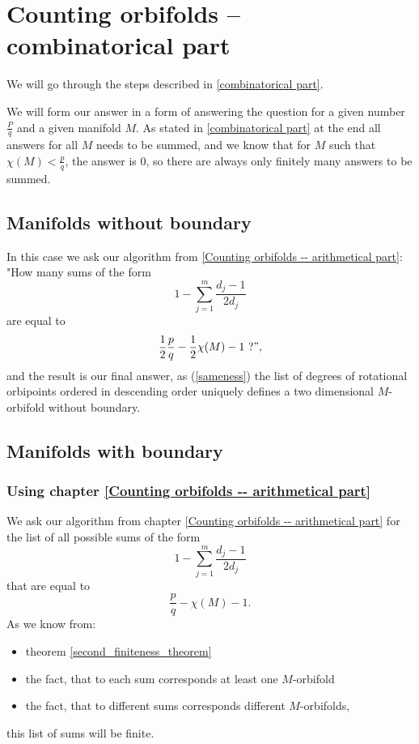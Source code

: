 \chapter{Counting orbifolds -- combinatorical part}\label{Counting orbifolds -- combinatorical part}
We will go through the steps described in \ref{combinatorical part}.

We will form our answer in a form of answering the 
question for a given number $\frac{P}{q}$ and a given manifold $M$. 
As stated in \ref{combinatorical part} at the end all answers for all $M$ needs to be summed, 
and we know that for $M$ such that $\chi(M) < \frac{p}{q}$, the answer is $0$, so there 
are always only finitely many answers to be summed. 

\section{Manifolds without boundary}
In this case we ask our algorithm from \ref{Counting orbifolds -- arithmetical part}: 
"How many sums of the form
\begin{equation}
1-\sum_{j=1}^m \frac{d_j-1}{2d_j} 
\end{equation}
are equal to 
\begin{equation}
\frac{1}{2}\frac{p}{q} - \frac{1}{2}\chi(M) -1\ ?",
\end{equation}
and the result is our final answer, as (\ref{sameness}) the list of degrees of rotational orbipoints ordered 
in descending order uniquely defines a two dimensional $M$-orbifold without boundary. 
\section{Manifolds with boundary}
\subsection{Using chapter \ref{Counting orbifolds -- arithmetical part}}\label{use algorithm step}
We ask our algorithm from chapter \ref{Counting orbifolds -- arithmetical part} for the list 
of all possible sums of the form
\begin{equation}
1-\sum_{j=1}^m \frac{d_j-1}{2d_j} 
\end{equation}
that are equal to 
\begin{equation}
\frac{p}{q} - \chi(M) - 1. 
\end{equation}
As we know from: 
\begin{itemize}
\item theorem \ref{second_finiteness_theorem} 
\item the fact, that to each 
sum corresponds at least one $M$-orbifold
\item the fact, that to different sums corresponds different $M$-orbifolds,
\end{itemize}
this list of sums will be finite. 
